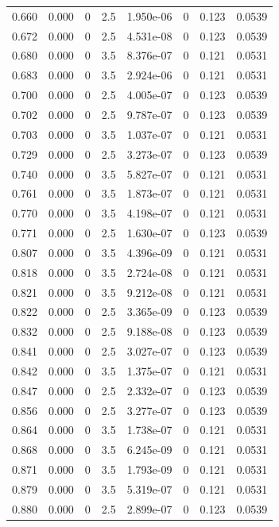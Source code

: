 \documentclass[preview]{standalone}
\begin{document}
{{{\begin{tabular}{L{1.2cm}C{1.2cm} C{0.3cm}C{0.5cm} C{1.4cm}C{1.4cm} C{1.4cm}C{1.4cm}}
  0.660  &  0.000  & 0     & 2.5 &  1.950e-06  & 0  & 0.123 &  0.0539   \\ 
  0.672  &  0.000  & 0     & 2.5 &  4.531e-08  & 0  & 0.123 &  0.0539   \\ 
  0.680  &  0.000  & 0     & 3.5 &  8.376e-07  & 0  & 0.121 &  0.0531   \\ 
  0.683  &  0.000  & 0     & 3.5 &  2.924e-06  & 0  & 0.121 &  0.0531   \\ 
  0.700  &  0.000  & 0     & 2.5 &  4.005e-07  & 0  & 0.123 &  0.0539   \\ 
  0.702  &  0.000  & 0     & 2.5 &  9.787e-07  & 0  & 0.123 &  0.0539   \\ 
  0.703  &  0.000  & 0     & 3.5 &  1.037e-07  & 0  & 0.121 &  0.0531   \\ 
  0.729  &  0.000  & 0     & 2.5 &  3.273e-07  & 0  & 0.123 &  0.0539   \\ 
  0.740  &  0.000  & 0     & 3.5 &  5.827e-07  & 0  & 0.121 &  0.0531   \\ 
  0.761  &  0.000  & 0     & 3.5 &  1.873e-07  & 0  & 0.121 &  0.0531   \\ 
  0.770  &  0.000  & 0     & 3.5 &  4.198e-07  & 0  & 0.121 &  0.0531   \\ 
  0.771  &  0.000  & 0     & 2.5 &  1.630e-07  & 0  & 0.123 &  0.0539   \\ 
  0.807  &  0.000  & 0     & 3.5 &  4.396e-09  & 0  & 0.121 &  0.0531   \\ 
  0.818  &  0.000  & 0     & 3.5 &  2.724e-08  & 0  & 0.121 &  0.0531   \\ 
  0.821  &  0.000  & 0     & 3.5 &  9.212e-08  & 0  & 0.121 &  0.0531   \\ 
  0.822  &  0.000  & 0     & 2.5 &  3.365e-09  & 0  & 0.123 &  0.0539   \\ 
  0.832  &  0.000  & 0     & 2.5 &  9.188e-08  & 0  & 0.123 &  0.0539   \\ 
  0.841  &  0.000  & 0     & 2.5 &  3.027e-07  & 0  & 0.123 &  0.0539   \\ 
  0.842  &  0.000  & 0     & 3.5 &  1.375e-07  & 0  & 0.121 &  0.0531   \\ 
  0.847  &  0.000  & 0     & 2.5 &  2.332e-07  & 0  & 0.123 &  0.0539   \\ 
  0.856  &  0.000  & 0     & 2.5 &  3.277e-07  & 0  & 0.123 &  0.0539   \\ 
  0.864  &  0.000  & 0     & 3.5 &  1.738e-07  & 0  & 0.121 &  0.0531   \\ 
  0.868  &  0.000  & 0     & 3.5 &  6.245e-09  & 0  & 0.121 &  0.0531   \\ 
  0.871  &  0.000  & 0     & 3.5 &  1.793e-09  & 0  & 0.121 &  0.0531   \\ 
  0.879  &  0.000  & 0     & 3.5 &  5.319e-07  & 0  & 0.121 &  0.0531   \\ 
  0.880  &  0.000  & 0     & 2.5 &  2.899e-07  & 0  & 0.123 &  0.0539   \\ 
\hline 
\end{tabular} 

}}}
\end{document}
